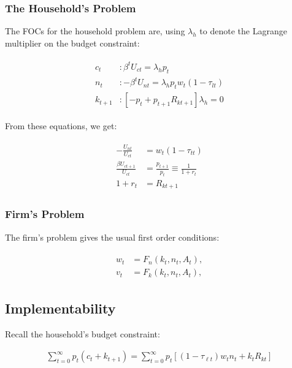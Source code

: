 \documentclass[10pt]{article}
\begin{document}
\subsubsection{The Household's Problem}

The FOCs for the household problem are,
using $\lambda_h$ to denote the Lagrange multiplier on the budget constraint:

\begin{align}
    \begin{aligned}
        c_t & : \beta^t U_{c t}=\lambda_h p_t \\
        n_t & :-\beta^t U_{n t}=\lambda_h p_t w_t\left(1-\tau_{l t}\right) \\
        k_{t+1} & :\left[-p_t+p_{t+1} R_{k t+1}\right] \lambda_h=0
        \end{aligned}
\end{align}

From these equations, we get:

\begin{align}
    \begin{aligned}
        -\frac{U_{n t}}{U_{c t}} & =w_t\left(1-\tau_{t t}\right) \\
        \frac{\beta U_{c t+1}}{U_{c t}} & =\frac{p_{t+1}}{p_t} \equiv \frac{1}{1+r_t} \\
        1+r_t & =R_{k t+1}
        \end{aligned}
\end{align}

\subsubsection{Firm's Problem}

The firm's problem gives the usual first order conditions:

\begin{align}
    \begin{aligned}
        w_t & =F_n\left(k_t, n_t, A_t\right), \\
        v_t & =F_k\left(k_t, n_t, A_t\right),
        \end{aligned}
\end{align}

\subsection{Implementability}

Recall the household's budget constraint:


\begin{align}
    \sum_{t=0}^{\infty} p_t\left(c_t+k_{t+1}\right)=\sum_{t=0}^{\infty} p_t\left[\left(1-\tau_{\ell t}\right) w_t n_t+k_t R_{k t}\right]
\end{align}
\end{document}
